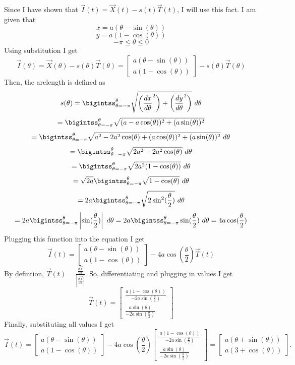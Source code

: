 \documentclass[titlepage]{article}
\begin{document}
\begin{solution}
Since I have shown that $\vec{I}(t) = \vec{X}(t) -s(t)\vec{T}(t)$, I will use this fact. I am given that 
$$x = a(\theta - \sin(\theta))$$
$$y = a(1 - \cos(\theta))$$
$$ -\pi \leq \theta \leq 0$$
Using substitution I get
$$\vec{I}(\theta) = \vec{X}(\theta) - s(\theta)\vec{T}(\theta) = \begin{bmatrix} a(\theta - \sin(\theta)) \\ a(1 - \cos(\theta)) \end{bmatrix} - s(\theta)\vec{T}(\theta)$$
Then, the arclength is defined as $$s(\theta) = \bigintss_{\theta = -\pi}^{\theta}\sqrt{\left(\frac{dx}{d\theta}^2\right) + \left(\frac{dy}{d\theta}^2\right)} \ d\theta$$
$$=  \bigintss_{\theta=-\pi}^{\theta}\sqrt{(a- a \cos(\theta))^2 + (a\sin(\theta))^2}$$
$$=  \bigintss_{\theta=-\pi}^{\theta}\sqrt{a^2 - 2a^2\cos(\theta) + (a\cos(\theta))^2 + (a\sin(\theta))^2}\ d\theta$$ 
$$=\bigintss_{\theta=-\pi}^{\theta}\sqrt{2a^2 - 2a^2\cos(\theta)} \ d\theta $$
$$= \bigintss_{\theta=-\pi}^{\theta}\sqrt{2a^2(1-\cos(\theta))}\ d\theta $$
$$= \sqrt{2a}\bigintss_{\theta=-\pi}^{\theta}\sqrt{1-\cos(\theta)} \ d\theta$$
$$= 2a\bigintss_{\theta=-\pi}^{\theta}\sqrt{2\sin^2(\frac{\theta}{2})} \ d\theta$$
$$= 2a \bigintss_{\theta=-\pi}^{\theta}\left|\sin(\frac{\theta}{2})\right| \ d\theta = 2a\bigintss_{\theta=-\pi}^{\theta}\sin(\frac{\theta}{2}) \ d\theta = 4a\cos(\frac{\theta}{2})$$
Plugging this function into the equation I get
$$\vec{I}(t) = \begin{bmatrix} a(\theta - \sin(\theta)) \\ a(1 - \cos(\theta)) \end{bmatrix} - 4a\cos(\frac{\theta}{2})\vec{T}(t)$$
By defintion, $\vec{T}(t) = \frac{\frac{d\vec{X}}{d\theta}}{\left|\frac{d\vec{X}}{d\theta}\right|}$. So, differentiating and plugging in values I get 
$$\vec{T}(t) = \begin{bmatrix} \frac{a(1-\cos(\theta))}{-2a\sin(\frac{\theta}{2})} \\ \frac{a\sin(\theta)}{-2a\sin(\frac{\theta}{2})}\end{bmatrix}$$
Finally, substituting all values I get
$$\vec{I}(t) = \begin{bmatrix} a(\theta - \sin(\theta)) \\ a(1 - \cos(\theta)) \end{bmatrix} - 4a\cos(\frac{\theta}{2})  \begin{bmatrix} \frac{a(1-\cos(\theta))}{-2a\sin(\frac{\theta}{2})} \\ \frac{a\sin(\theta)}{-2a\sin(\frac{\theta}{2})}\end{bmatrix} =\begin{bmatrix}a(\theta + \sin(\theta)) \\ a(3 + \cos(\theta)) \end{bmatrix}.$$
\end{solution}
\end{document}

